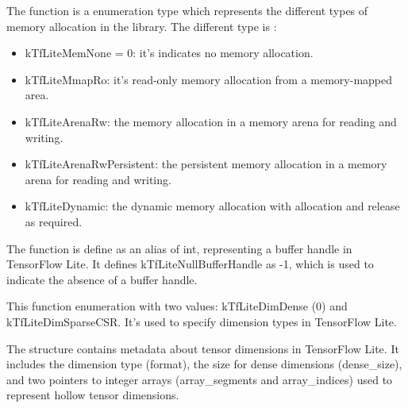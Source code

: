 \begin{center}
    \label{Figure:Comatibily}
\end{center}
The function  is a enumeration type which represents the different types of memory allocation in the library. The different type is : 

\begin{itemize}
    \item kTfLiteMemNone = 0:  it's indicates no memory allocation.
    \item kTfLiteMmapRo: it's read-only memory allocation from a memory-mapped area.
    \item kTfLiteArenaRw: the memory allocation in a memory arena for reading and writing.
    \item kTfLiteArenaRwPersistent: the persistent memory allocation in a memory arena for reading and writing.
    \item kTfLiteDynamic: the dynamic memory allocation with allocation and release as required.
\end{itemize}

\begin{center}
    \label{Figure:Comatibily}
\end{center}

The function  is define as an alias of int, representing a buffer handle in TensorFlow Lite. It defines kTfLiteNullBufferHandle as -1, which is used to indicate the absence of a buffer handle.

\bigskip 

This function enumeration  with two values: kTfLiteDimDense (0) and kTfLiteDimSparseCSR. It's used to specify dimension types in TensorFlow Lite.

\bigskip

The structure  contains metadata about tensor dimensions in TensorFlow Lite. It includes the dimension type (format), the size for dense dimensions (dense\_size), and two pointers to integer arrays (array\_segments and array\_indices) used to represent hollow tensor dimensions.

\begin{center}
    \label{Figure:Comatibily}
\end{center}

